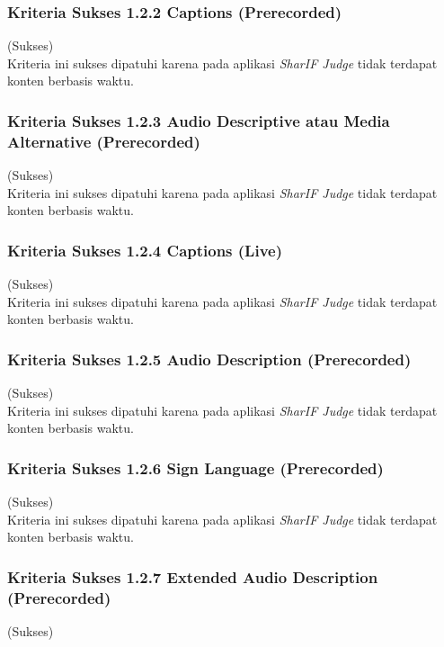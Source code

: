 \subsubsection{Kriteria Sukses 1.2.2 Captions (Prerecorded)}
\label{subsubsec:kepatuhan_kriteria_1.2.2}
(Sukses) \\

Kriteria ini sukses dipatuhi karena pada aplikasi \textit{SharIF Judge} tidak terdapat konten berbasis waktu.

\subsubsection{Kriteria Sukses 1.2.3 Audio Descriptive atau Media Alternative (Prerecorded)}
\label{subsubsec:kepatuhan_kriteria_1.2.3}
(Sukses) \\

Kriteria ini sukses dipatuhi karena pada aplikasi \textit{SharIF Judge} tidak terdapat konten berbasis waktu.

\subsubsection{Kriteria Sukses 1.2.4 Captions (Live)}
\label{subsubsec:kepatuhan_kriteria_1.2.4}
(Sukses) \\

Kriteria ini sukses dipatuhi karena pada aplikasi \textit{SharIF Judge} tidak terdapat konten berbasis waktu.

\subsubsection{Kriteria Sukses 1.2.5 Audio Description (Prerecorded)}
\label{subsubsec:kepatuhan_kriteria_1.2.5}
(Sukses) \\

Kriteria ini sukses dipatuhi karena pada aplikasi \textit{SharIF Judge} tidak terdapat konten berbasis waktu.

\subsubsection{Kriteria Sukses 1.2.6 Sign Language (Prerecorded)}
\label{subsubsec:kepatuhan_kriteria_1.2.6}
(Sukses) \\

Kriteria ini sukses dipatuhi karena pada aplikasi \textit{SharIF Judge} tidak terdapat konten berbasis waktu.

\subsubsection{Kriteria Sukses 1.2.7 Extended Audio Description (Prerecorded)}
\label{subsubsec:kepatuhan_kriteria_1.2.7}
(Sukses) \\

